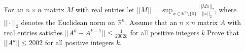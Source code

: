 \documentclass{article}
\begin{document}
\setlength{\parindent}{0pt}
For an $n\times n$ matrix $M$ with real entries let $||M||=\sup_{x\in\mathbb{R}^{n}\setminus\{0\}}\frac{||Mx||_{2}}{||x||_{2}}$, where $||\cdot||_{2}$ denotes the Euclidean norm on $\mathbb{R}^{n}$. Assume that an $n\times n$ matrix $A$ with real entries satisfies $||A^{k}-A^{k-1}||\le\frac{1}{2002k}$ for all positive integers $k$.\newline Prove that $||A^{k}||\le2002$ for all positive integers $k$.
\end{document}

